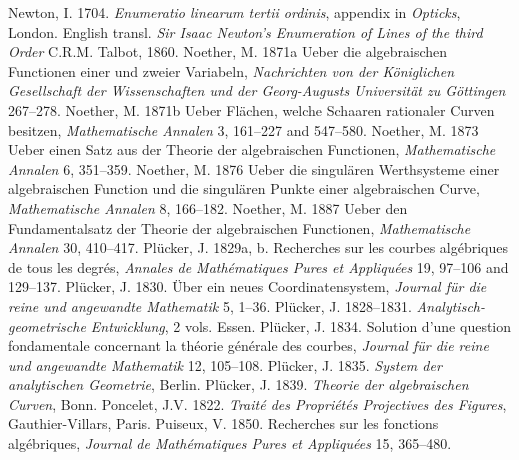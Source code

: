 \newline\indent Newton, I. 1704. \emph{Enumeratio linearum tertii ordinis}, appendix in \emph{Opticks}, London. English transl. \emph{Sir Isaac Newton's Enumeration of Lines of the third Order} C.R.M. Talbot, 1860.
\newline\indent Noether, M. 1871a Ueber die algebraischen Functionen einer und zweier Variabeln, \emph{Nachrichten von der K\"oniglichen Gesellschaft der Wissenschaften und der Georg-Augusts Universit\"at zu G\"ottingen} 267--278.
\newline\indent Noether, M. 1871b Ueber Fl\"achen, welche Schaaren rationaler Curven besitzen, \emph{Mathematische  Annalen} 3,   161--227 and 547--580.
\newline\indent Noether, M. 1873 Ueber einen Satz aus der Theorie der algebraischen Functionen, \emph{Mathematische Annalen} 6, 351--359.
\newline\indent Noether, M. 1876  Ueber die singul\"aren Werthsysteme einer algebraischen Function und die singul\"aren Punkte einer algebraischen Curve, \emph{Mathematische  Annalen} 8, 166--182.
\newline\indent Noether, M. 1887 Ueber den Fundamentalsatz der Theorie der
algebraischen Functionen,  \emph{Mathematische Annalen} 30, 410--417. 
\newline\indent Pl\"ucker, J. 1829a, b. Recherches sur les courbes alg\'ebriques de tous les degr\'es, \emph{Annales de Math\'e\-matiques Pures et Appliqu\'ees} 19, 97--106 and 129--137.
\newline\indent Pl\"ucker, J. 1830. \"Uber ein neues Coordinatensystem, \emph{Journal f\"ur die reine und angewandte Mathematik} 5, 1--36.
\newline\indent Pl\"ucker, J. 1828--1831.  \emph{Analytisch-geometrische Entwicklung}, 2 vols. Essen. 
\newline\indent Pl\"ucker, J. 1834. Solution d'une question fondamentale concernant la th\'eorie g\'en\'erale des courbes, \emph{Journal f\"ur die reine und angewandte Mathematik} 12, 105--108.
\newline\indent Pl\"ucker, J. 1835. \emph{System der analytischen Geometrie}, Berlin.
\newline\indent Pl\"ucker, J. 1839. \emph{Theorie der algebraischen Curven}, Bonn.
\newline\indent Poncelet, J.V. 1822. \emph{Trait\'{e} des Propri\'{e}t\'{e}s Projectives des Figures}, Gauthier-Villars, Paris.
\newline\indent Puiseux, V. 1850. Recherches sur les fonctions alg\'ebriques, \emph{Journal de Math\'ematiques Pures et Appliqu\'ees} 15, 365--480.
